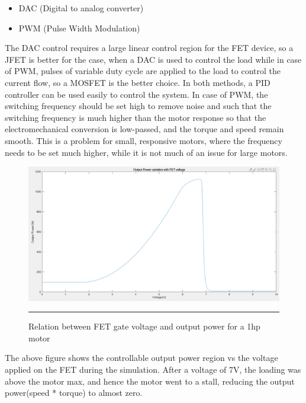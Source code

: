 \begin{itemize}
	\item DAC (Digital to analog converter)
	\item PWM (Pulse Width Modulation)
\end{itemize}
The DAC control requires a large linear control region for the FET device, so a JFET is better for the case, when a DAC is used to control the load while in case of PWM, pulses of variable duty cycle are applied to the load to control the current flow, so a MOSFET is the better choice. In both methods, a PID controller can be used easily to control the system. In case of PWM, the switching frequency should be set high to remove noise and such that the switching frequency is much higher than the motor response so that the electromechanical conversion is low-passed, and the torque and speed remain smooth. This is a problem for small, responsive motors, where the frequency needs to be set much higher, while it is not much of an issue for large motors. 
\begin{figure}[htbp]
	\centering
		\includegraphics[width = 4.5in]{./Figures/MS/fig35.png}
		\rule{35em}{0.5pt}
	\caption{Relation between FET gate voltage and output power for a 1hp motor}
	\label{fig:Relation between FET gate voltage and output power for a 1hp motor}
\end{figure}
The above figure shows the controllable output power region vs the voltage applied on the FET during the simulation. After a voltage of 7V, the loading was above the motor max, and hence the motor went to a stall, reducing the output power(speed * torque) to almost zero.

